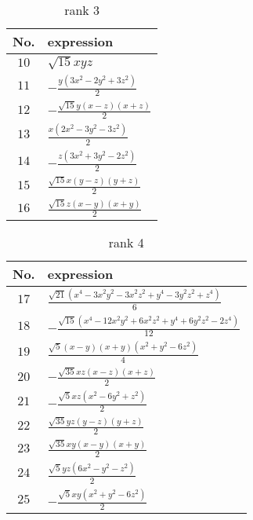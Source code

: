 \documentclass[fleqn,8pt,landscape]{jsarticle}
\begin{document}
\begin{table}[ht!]
\begin{center}
\caption{rank 3}
\renewcommand{\arraystretch}{1.3}
\begin{tabular}{cl} \hline \hline
No. & expression \\ \hline
$ 10 $ & $ \sqrt{15} x y z $ \\
$ 11 $ & $ - \frac{y \left(3 x^{2} - 2 y^{2} + 3 z^{2}\right)}{2} $ \\
$ 12 $ & $ - \frac{\sqrt{15} y \left(x - z\right) \left(x + z\right)}{2} $ \\
$ 13 $ & $ \frac{x \left(2 x^{2} - 3 y^{2} - 3 z^{2}\right)}{2} $ \\
$ 14 $ & $ - \frac{z \left(3 x^{2} + 3 y^{2} - 2 z^{2}\right)}{2} $ \\
$ 15 $ & $ \frac{\sqrt{15} x \left(y - z\right) \left(y + z\right)}{2} $ \\
$ 16 $ & $ \frac{\sqrt{15} z \left(x - y\right) \left(x + y\right)}{2} $ \\
 \hline \hline
\end{tabular}
\end{center}
\end{table}
\begin{table}[ht!]
\begin{center}
\caption{rank 4}
\renewcommand{\arraystretch}{1.3}
\begin{tabular}{cl} \hline \hline
No. & expression \\ \hline
$ 17 $ & $ \frac{\sqrt{21} \left(x^{4} - 3 x^{2} y^{2} - 3 x^{2} z^{2} + y^{4} - 3 y^{2} z^{2} + z^{4}\right)}{6} $ \\
$ 18 $ & $ - \frac{\sqrt{15} \left(x^{4} - 12 x^{2} y^{2} + 6 x^{2} z^{2} + y^{4} + 6 y^{2} z^{2} - 2 z^{4}\right)}{12} $ \\
$ 19 $ & $ \frac{\sqrt{5} \left(x - y\right) \left(x + y\right) \left(x^{2} + y^{2} - 6 z^{2}\right)}{4} $ \\
$ 20 $ & $ - \frac{\sqrt{35} x z \left(x - z\right) \left(x + z\right)}{2} $ \\
$ 21 $ & $ - \frac{\sqrt{5} x z \left(x^{2} - 6 y^{2} + z^{2}\right)}{2} $ \\
$ 22 $ & $ \frac{\sqrt{35} y z \left(y - z\right) \left(y + z\right)}{2} $ \\
$ 23 $ & $ \frac{\sqrt{35} x y \left(x - y\right) \left(x + y\right)}{2} $ \\
$ 24 $ & $ \frac{\sqrt{5} y z \left(6 x^{2} - y^{2} - z^{2}\right)}{2} $ \\
$ 25 $ & $ - \frac{\sqrt{5} x y \left(x^{2} + y^{2} - 6 z^{2}\right)}{2} $ \\
 \hline \hline
\end{tabular}
\end{center}
\end{table}
\end{document}
